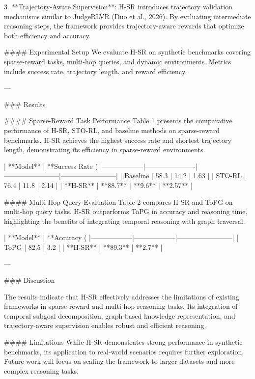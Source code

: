 3. **Trajectory-Aware Supervision**:  
   H-SR introduces trajectory validation mechanisms similar to JudgeRLVR (Duo et al., 2026). By evaluating intermediate reasoning steps, the framework provides trajectory-aware rewards that optimize both efficiency and accuracy.  

#### Experimental Setup  
We evaluate H-SR on synthetic benchmarks covering sparse-reward tasks, multi-hop queries, and dynamic environments. Metrics include success rate, trajectory length, and reward efficiency.

---

### Results  

#### Sparse-Reward Task Performance  
Table 1 presents the comparative performance of H-SR, STO-RL, and baseline methods on sparse-reward benchmarks. H-SR achieves the highest success rate and shortest trajectory length, demonstrating its efficiency in sparse-reward environments.

| **Model**       | **Success Rate (%
|------------------|----------------------|------------------------|------------------------|
| Baseline         | 58.3                | 14.2                  | 1.63                  |
| STO-RL           | 76.4                | 11.8                  | 2.14                  |
| **H-SR**         | **88.7**            | **9.6**               | **2.57**              |

#### Multi-Hop Query Evaluation  
Table 2 compares H-SR and ToPG on multi-hop query tasks. H-SR outperforms ToPG in accuracy and reasoning time, highlighting the benefits of integrating temporal reasoning with graph traversal.

| **Model**       | **Accuracy (%
|------------------|------------------|------------------------|
| ToPG            | 82.5             | 3.2                    |
| **H-SR**         | **89.3**         | **2.7**                |

---

### Discussion  

The results indicate that H-SR effectively addresses the limitations of existing frameworks in sparse-reward and multi-hop reasoning tasks. Its integration of temporal subgoal decomposition, graph-based knowledge representation, and trajectory-aware supervision enables robust and efficient reasoning.  

#### Limitations  
While H-SR demonstrates strong performance in synthetic benchmarks, its application to real-world scenarios requires further exploration. Future work will focus on scaling the framework to larger datasets and more complex reasoning tasks.

